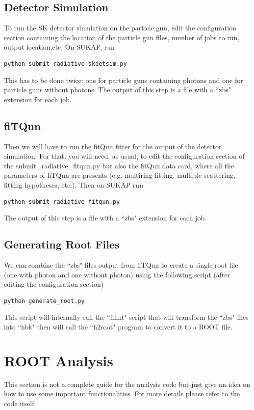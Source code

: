 \documentclass[12pt]{article}
\begin{document}
\subsection{Detector Simulation}
To run the SK detector simulation on the particle gun, edit the configuration section containing the location of the particle gun files, number of jobs to run, output location,etc. On SUKAP, run
\begin{lstlisting}[language=Python, caption=SK Detector Simulation]
python submit_radiative_skdetsim.py 						
\end{lstlisting} 
This has to be done twice: one for particle guns containing photons and one for particle guns without photons.
The output of this step is a file with a ``zbs" extension for each job.
\subsection{fiTQun}
 Then we will have to run the fitQun fitter for the output of the detector simulation. For that, you will need, as usual, to edit the configuration section of the submit\_radiative\_fitqun.py but also the fitQun data card, where all the parameters of fiTQun are presents (e.g. multiring fitting, multiple scattering, fitting hypotheses, etc.). Then on SUKAP run 
 \begin{lstlisting}[language=Python, caption=Running fiTQun]
 python submit_radiative_fitqun.py 						
 \end{lstlisting} 
 The output of this step is a file with a ``zbs" extension for each job.
 \subsection{Generating Root Files}
 We can combine the ``zbs" files output from fiTQun to create a single root file (one with photon and one without photon) using the following script (after editing the configuration section)
  \begin{lstlisting}[language=Python, caption=Generating ROOT Files]
 python generate_root.py 						
 \end{lstlisting} 
 This script will internally call the ``fillnt" script that will transform the ``zbs" files into ``hbk" then will call the ``h2root" program to convert it to a ROOT file.
  
\section{ROOT Analysis}
This section is not a complete guide for the analysis code but just give an idea on how to use some important functionalities. For more details please refer to the code itself.
\end{document}
